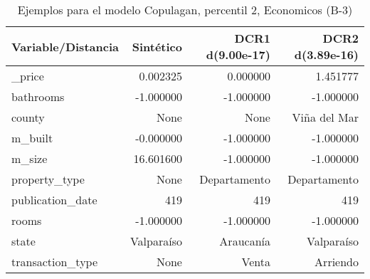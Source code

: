 \begin{table}[H]
\centering
\fontsize{10}{14}\selectfont
\caption{Ejemplos para el modelo Copulagan, percentil 2, Economicos (B-3)}
\label{table-example-economicos-b-3-copulagan-2p}
\begin{tabular}{|l|r|r|r|}
\hline
\rowcolor[gray]{0.8}
Variable/Distancia & Sintético & DCR1 d(9.00e-17) & DCR2 d(3.89e-16) \\
\hline \_price & \cellcolor[rgb]{0.9, 0.54, 0.52} 0.002325 & \cellcolor[rgb]{0.9, 0.54, 0.52} 0.000000 & 1.451777 \\
\hline bathrooms & \cellcolor[rgb]{0.9, 0.54, 0.52} -1.000000 & \cellcolor[rgb]{0.9, 0.54, 0.52} -1.000000 & \cellcolor[rgb]{0.9, 0.54, 0.52} -1.000000 \\
\hline county & \cellcolor[rgb]{0.9, 0.54, 0.52} None & \cellcolor[rgb]{0.9, 0.54, 0.52} None & Viña del Mar \\
\hline m\_built & \cellcolor[rgb]{0.9, 0.54, 0.52} -0.000000 & \cellcolor[rgb]{0.9, 0.54, 0.52} -1.000000 & \cellcolor[rgb]{0.9, 0.54, 0.52} -1.000000 \\
\hline m\_size & \cellcolor[rgb]{0.9, 0.54, 0.52} 16.601600 & -1.000000 & -1.000000 \\
\hline property\_type & \cellcolor[rgb]{0.9, 0.54, 0.52} None & Departamento & Departamento \\
\hline publication\_date & \cellcolor[rgb]{0.9, 0.54, 0.52} 419 & \cellcolor[rgb]{0.9, 0.54, 0.52} 419 & \cellcolor[rgb]{0.9, 0.54, 0.52} 419 \\
\hline rooms & \cellcolor[rgb]{0.9, 0.54, 0.52} -1.000000 & \cellcolor[rgb]{0.9, 0.54, 0.52} -1.000000 & \cellcolor[rgb]{0.9, 0.54, 0.52} -1.000000 \\
\hline state & \cellcolor[rgb]{0.9, 0.54, 0.52} Valparaíso & Araucanía & \cellcolor[rgb]{0.9, 0.54, 0.52} Valparaíso \\
\hline transaction\_type & \cellcolor[rgb]{0.9, 0.54, 0.52} None & Venta & Arriendo \\
\hline
\end{tabular}
\end{table}
